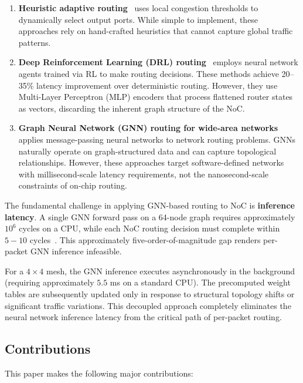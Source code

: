 \begin{enumerate}
    \item \textbf{Heuristic adaptive routing}~\cite{dyad2004,ebrahimi2019} uses local congestion thresholds to dynamically select output ports. While simple to implement, these approaches rely on hand-crafted heuristics that cannot capture global traffic patterns.
    
    \item \textbf{Deep Reinforcement Learning (DRL) routing}~\cite{wang2022maar,deepnr2022,garnn2023} employs neural network agents trained via RL to make routing decisions. These methods achieve 20--35\% latency improvement over deterministic routing. However, they use Multi-Layer Perceptron (MLP) encoders that process flattened router states as vectors, discarding the inherent graph structure of the NoC.
    
    \item \textbf{Graph Neural Network (GNN) routing for wide-area networks}~\cite{g-routing2023,drl-gnn2019} applies message-passing neural networks to network routing problems. GNNs naturally operate on graph-structured data and can capture topological relationships. However, these approaches target software-defined networks with millisecond-scale latency requirements, not the nanosecond-scale constraints of on-chip routing.
\end{enumerate}

The fundamental challenge in applying GNN-based routing to NoC is \textbf{inference latency}. A single GNN forward pass on a 64-node graph requires approximately $10^6$ cycles on a CPU, while each NoC routing decision must complete within $5-10$ cycles~\cite{wang2022maar}. This approximately five-order-of-magnitude gap renders per-packet GNN inference infeasible.

For a $4\times4$ mesh, the GNN inference executes asynchronously in the background (requiring approximately $5.5$ ms on a standard CPU). The precomputed weight tables are subsequently updated only in response to structural topology shifts or significant traffic variations. This decoupled approach completely eliminates the neural network inference latency from the critical path of per-packet routing.

\subsection{Contributions}

This paper makes the following major contributions:

